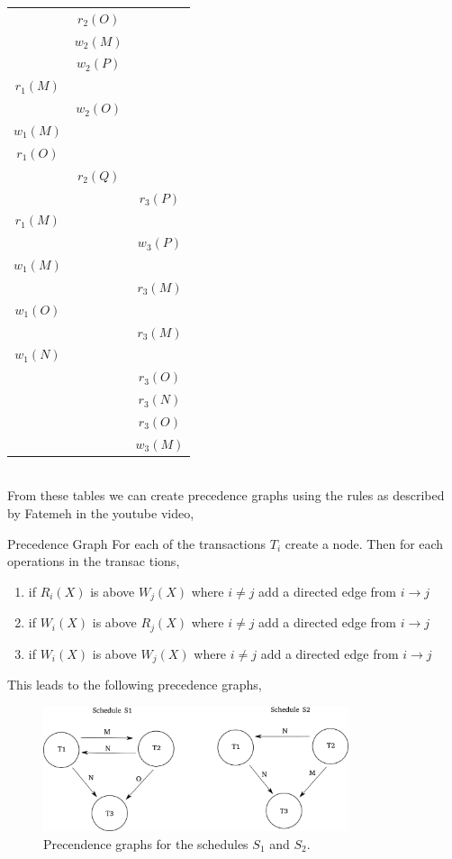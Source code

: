 \documentclass[working, oneside]{../../Preambles/tuftebook}
\begin{document}
{\begin{minipage}[t]{0.48\textwidth}
\begin{tabular}{c|c|c}
& \( r_2(O) \) & \\
& \( w_2(M) \) & \\
& \( w_2(P) \) & \\
\( r_1(M) \) & & \\
& \( w_2(O) \) & \\
\( w_1(M) \) & & \\
\( r_1(O) \) & & \\
& \( r_2(Q) \) & \\
& & \( r_3(P) \) \\
\( r_1(M) \) & & \\
& & \( w_3(P) \) \\
\( w_1(M) \) & & \\
& & \( r_3(M) \) \\
\( w_1(O) \) & & \\
& & \( r_3(M) \) \\
\( w_1(N) \) & & \\
& & \( r_3(O) \) \\
& & \( r_3(N) \) \\
& & \( r_3(O) \) \\
& & \( w_3(M) \) \\
\end{tabular}
\end{minipage}
}
\vspace{1cm}\\
\noindent
From these tables we can create precedence graphs using the rules as described by Fatemeh in the youtube video,
\begin{SimpleBox}{Precedence Graph}
For each of the transactions $T_i$ create a node. Then for each operations in the transac tions,
\begin{enumerate}
    \item if $R_i\left( X \right) $ is above $W_j\left( X \right) $ where $i\neq j$ add a directed edge from $i \to j$
    \item if $W_i\left( X \right) $ is above $R_j\left( X \right) $ where $i\neq j$ add a directed edge from $i \to j$
    \item if $W_i\left( X \right) $ is above $W_j\left( X \right) $ where $i\neq j$ add a directed edge from $i \to j$
\end{enumerate}
\end{SimpleBox}
This leads to the following precedence graphs,
\begin{figure}[htpb]
    \centering
    \includegraphics[width=0.8\textwidth]{afl8}
    \caption{Precendence graphs for the schedules $S_1$ and $S_2$.}
\end{figure}\\
\end{document}
